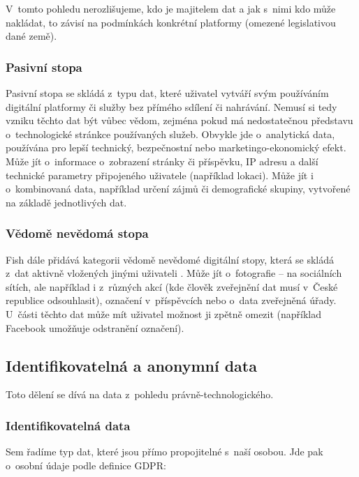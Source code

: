 V~tomto pohledu nerozlišujeme, kdo je majitelem dat a jak s~nimi kdo může nakládat, to závisí na podmínkách konkrétní platformy (omezené legislativou dané země).

\subsubsection*{Pasivní stopa}

Pasivní stopa se skládá z~typu dat, které uživatel vytváří svým používáním digitální platformy či služby bez přímého sdílení či nahrávání. Nemusí si tedy vzniku těchto dat být vůbec vědom, zejména pokud má nedostatečnou představu o~technologické stránkce používaných služeb. Obvykle jde o~analytická data, používána pro lepší technický, bezpečnostní nebo marketingo-ekonomický efekt. Může jít o~informace o~zobrazení stránky či příspěvku, IP adresu a další technické parametry připojeného uživatele (například lokaci). Může jít i o~kombinovaná data, například určení zájmů či demografické skupiny, vytvořené na základě jednotlivých dat.

\subsubsection*{Vědomě nevědomá stopa}

Fish dále přidává kategorii vědomě nevědomé digitální stopy, která se skládá z~dat aktivně vložených jinými uživateli \citep{fish-digital-footprint}.
Může jít o~fotografie -- na sociálních sítích, ale například i z~různých akcí (kde člověk zveřejnění dat musí v~České republice odsouhlasit), označení v~příspěvcích nebo o~data zveřejněná úřady. U~části těchto dat může mít uživatel možnost ji zpětně omezit (například Facebook umožňuje odstranění označení).

\subsection{Identifikovatelná a anonymní data}
Toto dělení se dívá na data z~pohledu právně-technologického.

\subsubsection*{Identifikovatelná data}

Sem řadíme typ dat, které jsou přímo propojitelné s~naší osobou. Jde pak o~osobní údaje podle definice GDPR:

\begin{displayquote}
	\citep{gdpr}
\end{displayquote}

